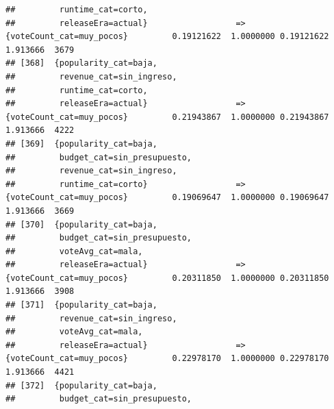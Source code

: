 \documentclass[
]{article}
\begin{document}
\begin{verbatim}
##         runtime_cat=corto,                                                                                                      
##         releaseEra=actual}                  => {voteCount_cat=muy_pocos}         0.19121622  1.0000000 0.19121622 1.913666  3679
## [368]  {popularity_cat=baja,                                                                                                    
##         revenue_cat=sin_ingreso,                                                                                                
##         runtime_cat=corto,                                                                                                      
##         releaseEra=actual}                  => {voteCount_cat=muy_pocos}         0.21943867  1.0000000 0.21943867 1.913666  4222
## [369]  {popularity_cat=baja,                                                                                                    
##         budget_cat=sin_presupuesto,                                                                                             
##         revenue_cat=sin_ingreso,                                                                                                
##         runtime_cat=corto}                  => {voteCount_cat=muy_pocos}         0.19069647  1.0000000 0.19069647 1.913666  3669
## [370]  {popularity_cat=baja,                                                                                                    
##         budget_cat=sin_presupuesto,                                                                                             
##         voteAvg_cat=mala,                                                                                                       
##         releaseEra=actual}                  => {voteCount_cat=muy_pocos}         0.20311850  1.0000000 0.20311850 1.913666  3908
## [371]  {popularity_cat=baja,                                                                                                    
##         revenue_cat=sin_ingreso,                                                                                                
##         voteAvg_cat=mala,                                                                                                       
##         releaseEra=actual}                  => {voteCount_cat=muy_pocos}         0.22978170  1.0000000 0.22978170 1.913666  4421
## [372]  {popularity_cat=baja,                                                                                                    
##         budget_cat=sin_presupuesto,                                                                                             

\end{verbatim}
\end{document}
